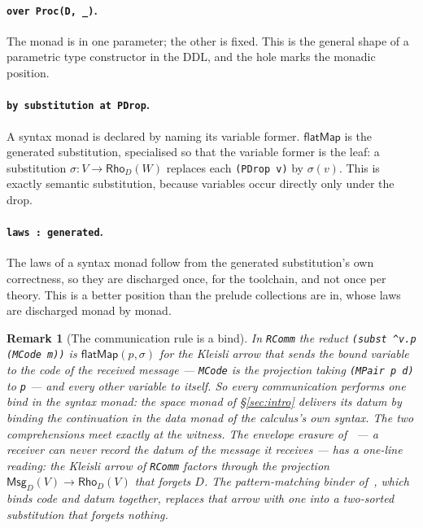 \documentclass[11pt]{article}
\theoremstyle{branddef}
\theoremstyle{brandplain}
\theoremstyle{brandrem}
\newtheorem{remark}[definition]{Remark}
\newcommand{\bind}{\mathsf{flatMap}}
\begin{document}
\paragraph{\texttt{over Proc(D, \_)}.} The monad is in one parameter; the other
is fixed. This is the general shape of a parametric type constructor in the
DDL, and the hole marks the monadic position.

\paragraph{\texttt{by substitution at PDrop}.} A syntax monad is declared by
naming its variable former. \(\bind\) is the generated substitution, specialised
so that the variable former is the leaf: a substitution
\(\sigma : V\to\mathsf{Rho}_D(W)\) replaces each \texttt{(PDrop v)} by
\(\sigma(v)\). This is exactly semantic substitution, because variables occur
directly only under the drop.

\paragraph{\texttt{laws : generated}.} The laws of a syntax monad follow from
the generated substitution's own correctness, so they are discharged once, for
the toolchain, and not once per theory. This is a better position than the
prelude collections are in, whose laws are discharged monad by monad.

\begin{remark}[The communication rule is a bind]
\label{rem:commbind}
In \texttt{RComm} the reduct \texttt{(subst \^{}v.p (MCode m))} is
\(\bind(p, \sigma)\) for the Kleisli arrow that sends the bound variable to the
code of the received message --- \texttt{MCode} is the projection taking
\texttt{(MPair p d)} to \texttt{p} --- and every other variable to itself. So every
communication performs one bind in the syntax monad: the space monad of
\S\ref{sec:intro} delivers its datum by binding the continuation in the data
monad of the calculus's own syntax. The two comprehensions meet exactly at the
witness. The envelope erasure of~\cite{WSH} --- a receiver can never record the
datum of the message it receives --- has a one-line reading: the Kleisli arrow
of \texttt{RComm} factors through the projection
\(\mathsf{Msg}_D(V)\to\mathsf{Rho}_D(V)\) that forgets \(D\). The
pattern-matching binder of~\cite{Oriented}, which binds code and datum
together, replaces that arrow with one into a two-sorted substitution that
forgets nothing.
\end{remark}
\end{document}
